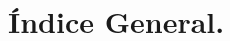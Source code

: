 \chapter*{\sloppy Índice General.}

\renewcommand{\contentsname}{\fontsize{12}{18}\selectfont Contenido.}
\renewcommand{\cftchapleader}{\cftdotfill{\cftdotsep}}

\setlength{\cftbeforetoctitleskip}{1pt}
\setlength{\cftaftertoctitleskip}{0pt}

\setlength{\cftbeforechapskip}{0pt}
\renewcommand{\cftchapfont}{\bfseries}
\renewcommand{\cftchappagefont}{\bfseries}

\renewcommand{\cftchappresnum}{Capítulo~}
\renewcommand{\cftchapnumwidth}{5em}



\tableofcontents